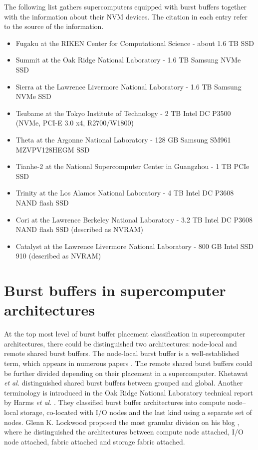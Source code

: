 \documentclass[thesis-en.tex]{subfiles}
\begin{document}
The following list gathers supercomputers equipped with burst buffers together with the information about their NVM devices. The citation in each entry refer to the source of the information.
\begin{itemize}
\item Fugaku at the RIKEN Center for Computational Science - about 1.6 TB SSD \cite{fugaku,dongarra2020report}
\item Summit at the Oak Ridge National Laboratory - 1.6 TB Samsung NVMe SSD \cite{osti_1489443}
\item Sierra at the Lawrence Livermore National Laboratory - 1.6 TB Samsung NVMe SSD \cite{osti_1489443}
\item Tsubame at the Tokyo Institute of Technology - 2 TB Intel DC P3500 (NVMe, PCI-E 3.0 x4, R2700/W1800) \cite{tsubame}
\item Theta at the Argonne National Laboratory - 128 GB Samsung SM961 MZVPV128HEGM SSD \cite{theta-fs}
\item Tianhe-2 at the National Supercomputer Center in Guangzhou - 1 TB PCIe SSD \cite{tianhe}
\item Trinity at the Los Alamos National Laboratory - 4 TB Intel DC P3608 NAND flash SSD \cite{trinity,osti_1367056}
\item Cori at the Lawrence Berkeley National Laboratory - 3.2 TB Intel DC P3608 NAND flash SSD (described as NVRAM) \cite{cori, cori-exp, bhimji2016accelerating, Bhimji_2017}
\item Catalyst at the Lawrence Livermore National Laboratory - 800 GB Intel SSD 910 (described as NVRAM) \cite{catalyst,7573843}
\end{itemize}

\section{Burst buffers in supercomputer architectures} \label{sec:architectures}
At the top most level of burst buffer placement classification in supercomputer architectures, there could be distinguished two architectures: node-local and remote shared burst buffers. The node-local burst buffer is a well-established term, which appears in numerous papers \cite{8891051,10.5555/3108096.3108100,osti_1328312}. The remote shared burst buffers could be further divided depending on their placement in a supercomputer. Khetawat \textit{et al.} \cite{8891051} distinguished shared burst buffers between grouped and global. Another terminology is introduced in the Oak Ridge National Laboratory technical report by Harms \textit{et al.} \cite{osti_1328312}. They classified burst buffer architectures into compute node--local storage, co-located with I/O nodes and the last kind using a separate set of nodes. Glenn K. Lockwood proposed the most granular division on his blog \cite{lockwood-blog}, where he distinguished the architectures between compute node attached, I/O node attached, fabric attached and storage fabric attached.
\end{document}
